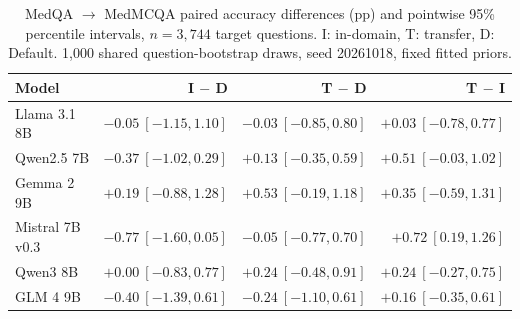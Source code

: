 \begin{table}[htbp]
\centering\small\setlength{\tabcolsep}{4pt}
\caption{MedQA $\rightarrow$ MedMCQA paired accuracy differences (pp) and pointwise 95\% percentile intervals, $n=3,744$ target questions. I: in-domain, T: transfer, D: Default. 1,000 shared question-bootstrap draws, seed 20261018, fixed fitted priors.}
\label{tab:intervals-medqa}
\begin{tabular}{lrrr}
\toprule
Model & I $-$ D & T $-$ D & T $-$ I\\
\midrule
Llama 3.1 8B & $-0.05~[-1.15,1.10]$ & $-0.03~[-0.85,0.80]$ & $+0.03~[-0.78,0.77]$\\
Qwen2.5 7B & $-0.37~[-1.02,0.29]$ & $+0.13~[-0.35,0.59]$ & $+0.51~[-0.03,1.02]$\\
Gemma 2 9B & $+0.19~[-0.88,1.28]$ & $+0.53~[-0.19,1.18]$ & $+0.35~[-0.59,1.31]$\\
Mistral 7B v0.3 & $-0.77~[-1.60,0.05]$ & $-0.05~[-0.77,0.70]$ & $+0.72~[0.19,1.26]$\\
Qwen3 8B & $+0.00~[-0.83,0.77]$ & $+0.24~[-0.48,0.91]$ & $+0.24~[-0.27,0.75]$\\
GLM 4 9B & $-0.40~[-1.39,0.61]$ & $-0.24~[-1.10,0.61]$ & $+0.16~[-0.35,0.61]$\\
\bottomrule
\end{tabular}
\end{table}
